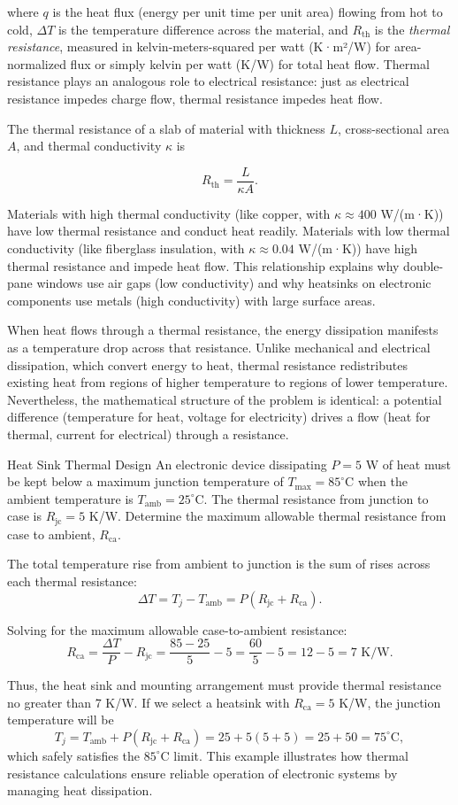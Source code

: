 where $q$ is the heat flux (energy per unit time per unit area) flowing from hot to cold, $\Delta T$ is the temperature difference across the material, and $R_{\text{th}}$ is the \emph{thermal resistance}, measured in kelvin-meters-squared per watt (K·m²/W) for area-normalized flux or simply kelvin per watt (K/W) for total heat flow. Thermal resistance plays an analogous role to electrical resistance: just as electrical resistance impedes charge flow, thermal resistance impedes heat flow.

The thermal resistance of a slab of material with thickness $L$, cross-sectional area $A$, and thermal conductivity $\kappa$ is

$$R_{\text{th}} = \frac{L}{\kappa A}.$$

Materials with high thermal conductivity (like copper, with $\kappa \approx 400$ W/(m·K)) have low thermal resistance and conduct heat readily. Materials with low thermal conductivity (like fiberglass insulation, with $\kappa \approx 0.04$ W/(m·K)) have high thermal resistance and impede heat flow. This relationship explains why double-pane windows use air gaps (low conductivity) and why heatsinks on electronic components use metals (high conductivity) with large surface areas.

When heat flows through a thermal resistance, the energy dissipation manifests as a temperature drop across that resistance. Unlike mechanical and electrical dissipation, which convert energy to heat, thermal resistance redistributes existing heat from regions of higher temperature to regions of lower temperature. Nevertheless, the mathematical structure of the problem is identical: a potential difference (temperature for heat, voltage for electricity) drives a flow (heat for thermal, current for electrical) through a resistance.

\begin{example}{Heat Sink Thermal Design}
An electronic device dissipating $P = 5$ W of heat must be kept below a maximum junction temperature of $T_{\max} = 85^\circ$C when the ambient temperature is $T_{\text{amb}} = 25^\circ$C. The thermal resistance from junction to case is $R_{\text{jc}} = 5$ K/W. Determine the maximum allowable thermal resistance from case to ambient, $R_{\text{ca}}$.

The total temperature rise from ambient to junction is the sum of rises across each thermal resistance:
$$\Delta T = T_j - T_{\text{amb}} = P (R_{\text{jc}} + R_{\text{ca}}).$$

Solving for the maximum allowable case-to-ambient resistance:
$$R_{\text{ca}} = \frac{\Delta T}{P} - R_{\text{jc}} = \frac{85 - 25}{5} - 5 = \frac{60}{5} - 5 = 12 - 5 = 7 \text{ K/W}.$$

Thus, the heat sink and mounting arrangement must provide thermal resistance no greater than 7 K/W. If we select a heatsink with $R_{\text{ca}} = 5$ K/W, the junction temperature will be
$$T_j = T_{\text{amb}} + P(R_{\text{jc}} + R_{\text{ca}}) = 25 + 5(5 + 5) = 25 + 50 = 75^\circ\text{C},$$
which safely satisfies the $85^\circ$C limit. This example illustrates how thermal resistance calculations ensure reliable operation of electronic systems by managing heat dissipation.
\end{example}

